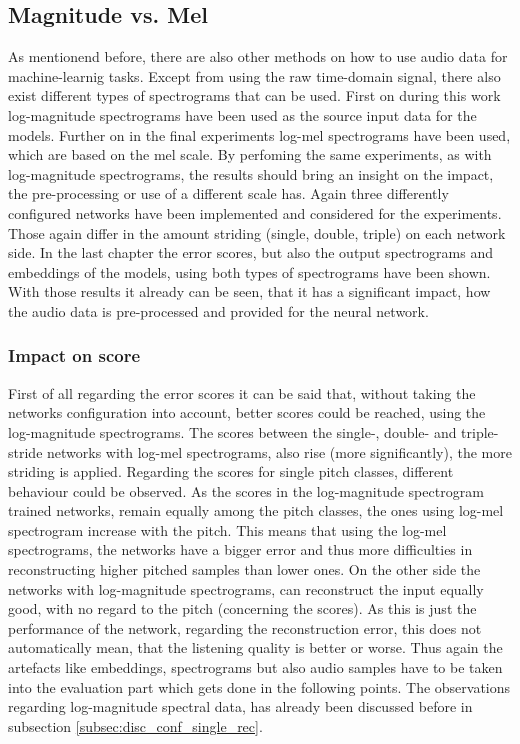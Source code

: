 \subsection{Magnitude vs. Mel}
As mentionend before, there are also other methods on how to use audio data for machine-learnig tasks. Except from using the raw time-domain signal, there also exist different types of spectrograms that can be used. First on during this work log-magnitude spectrograms have been used as the source input data for the models. Further on in the final experiments log-mel spectrograms have been used, which are based on the mel scale. By perfoming the same experiments, as with log-magnitude spectrograms, the results should bring an insight on the impact, the pre-processing or use of a different scale has. Again three differently configured networks have been implemented and considered for the experiments. Those again differ in the amount striding (single, double, triple) on each network side. In the last chapter the error scores, but also the output spectrograms and embeddings of the models, using both types of spectrograms have been shown. With those results it already can be seen, that it has a significant impact, how the audio data is pre-processed and provided for the neural network. 

\subsubsection{Impact on score}
First of all regarding the error scores it can be said that, without taking the networks configuration into account, better scores could be reached, using the log-magnitude spectrograms. The scores between the single-, double- and triple-stride networks with log-mel spectrograms, also rise (more significantly), the more striding is applied. Regarding the scores for single pitch classes, different behaviour could be observed. As the scores in the log-magnitude spectrogram trained networks, remain equally among the pitch classes, the ones using log-mel spectrogram increase with the pitch. This means that using the log-mel spectrograms, the networks have a bigger error and thus more difficulties in reconstructing higher pitched samples than lower ones. On the other side the networks with log-magnitude spectrograms, can reconstruct the input equally good, with no regard to the pitch (concerning the scores). As this is just the performance of the network, regarding the reconstruction error, this does not automatically mean, that the listening quality is better or worse. Thus again the artefacts like embeddings, spectrograms but also audio samples have to be taken into the evaluation part which gets done in the following points. The observations regarding log-magnitude spectral data, has already been discussed before in subsection \ref{subsec:disc_conf_single_rec}.


